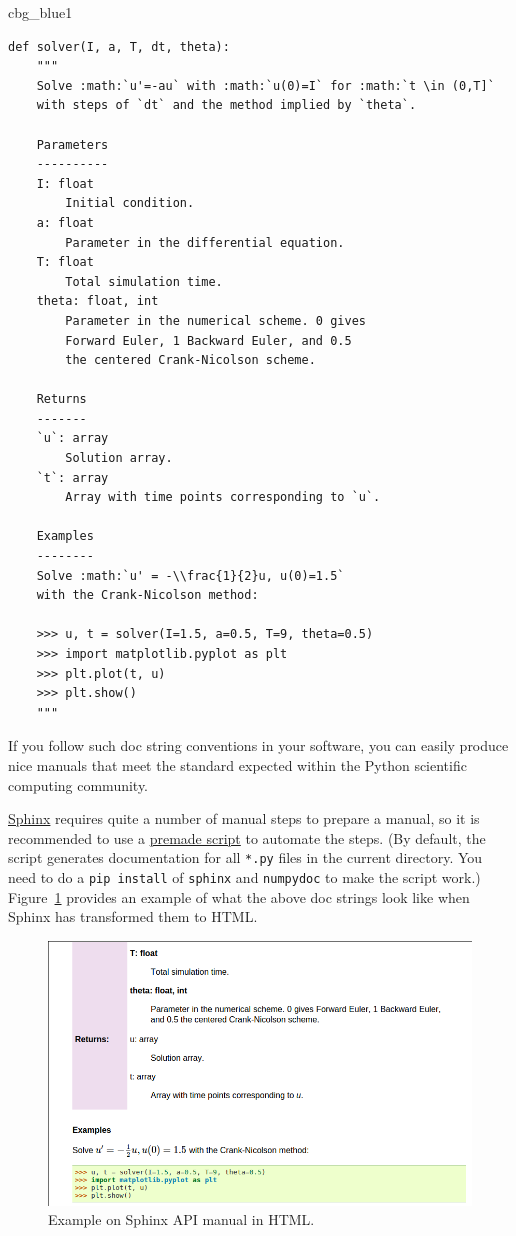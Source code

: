 \documentclass[%
oneside,                 %
final,                   %
10pt]{article}
\newenvironment{_cod_tight}[1]{
   \def\FrameCommand{\colorbox{#1}}
   \FrameRule0.6pt\MakeFramed {\FrameRestore}\vskip3mm}
   {\vskip0mm\endMakeFramed}
\newenvironment{cod}[1]{
\bgroup\rmfamily
\fboxsep=0mm\relax
\begin{_cod_tight}{#1}
\list{}{\parsep=-2mm\parskip=0mm\topsep=0pt\leftmargin=2mm
\rightmargin=2\leftmargin\leftmargin=4pt\relax}
\item\relax}
{\endlist\end{_cod_tight}\egroup}
\begin{document}
\begin{cod}{cbg_blue1}\begin{Verbatim}[numbers=none,fontsize=\fontsize{9pt}{9pt},baselinestretch=0.95,xleftmargin=2mm]
def solver(I, a, T, dt, theta):
    """
    Solve :math:`u'=-au` with :math:`u(0)=I` for :math:`t \in (0,T]`
    with steps of `dt` and the method implied by `theta`.

    Parameters
    ----------
    I: float
        Initial condition.
    a: float
        Parameter in the differential equation.
    T: float
        Total simulation time.
    theta: float, int
        Parameter in the numerical scheme. 0 gives
        Forward Euler, 1 Backward Euler, and 0.5
        the centered Crank-Nicolson scheme.

    Returns
    -------
    `u`: array
        Solution array.
    `t`: array
        Array with time points corresponding to `u`.

    Examples
    --------
    Solve :math:`u' = -\\frac{1}{2}u, u(0)=1.5`
    with the Crank-Nicolson method:

    >>> u, t = solver(I=1.5, a=0.5, T=9, theta=0.5)
    >>> import matplotlib.pyplot as plt
    >>> plt.plot(t, u)
    >>> plt.show()
    """
\end{Verbatim}
\end{cod}
\noindent
If you follow such doc string conventions in your software, you can
easily produce nice manuals that meet the standard expected within
the Python scientific computing community.


\href{{http://sphinx-doc.org/}}{Sphinx} requires quite a number of manual steps to
prepare a manual, so it is
recommended to use a \href{{http://tinyurl.com/ofkw6kc/softeng/make_sphinx_api.py}}{premade script} to automate the steps. (By default,
the script generates documentation for all \texttt{*.py} files in the
current directory.
You need to do a \texttt{pip install} of \texttt{sphinx} and \texttt{numpydoc} to make the
script work.)
Figure~\ref{softeng1:basic:docstring:fig} provides an example of what
the above doc strings look like when Sphinx has transformed them to HTML.


\begin{figure}[!ht]  %
  \centerline{\includegraphics[width=0.8\linewidth]{fig-softeng/selfdoc_numpy.png}}
  \caption{
  Example on Sphinx API manual in HTML. \label{softeng1:basic:docstring:fig}
  }
\end{figure}
\end{document}
